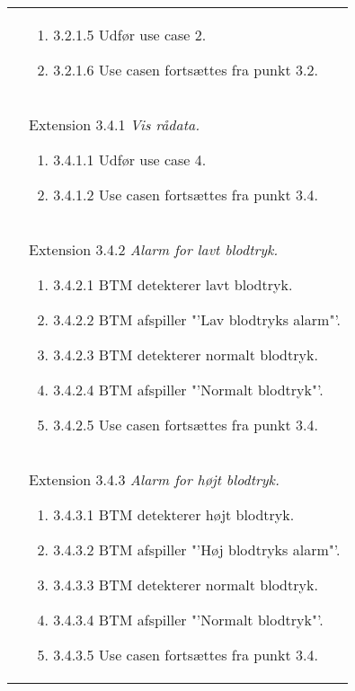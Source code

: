 \begin{table}[H]
\begin{tabular}{|p{5.5cm}|p{10cm}|}
\hline
& \begin{enumerate}
\item[\labelname]3.2.1.5   Udfør use case 2.
\item[\labelname]3.2.1.6   Use casen fortsættes fra punkt 3.2. 
\end{enumerate}
\\
& Extension 3.4.1 \textit{Vis rådata.}
\begin{enumerate}
\setlength\itemsep{0.1em}
\item[\labelname]3.4.1.1   Udfør use case 4.
\item[\labelname]3.4.1.2   Use casen fortsættes fra punkt 3.4. 
\end{enumerate}
\\
& Extension 3.4.2 \textit{Alarm for lavt blodtryk.}
\begin{enumerate}
\setlength\itemsep{0.1em}
\item[\labelname]3.4.2.1   BTM detekterer lavt blodtryk.
\item[\labelname]3.4.2.2   BTM afspiller "'Lav blodtryks alarm"'.
\item[\labelname]3.4.2.3   BTM detekterer normalt blodtryk.
\item[\labelname]3.4.2.4   BTM afspiller "'Normalt blodtryk"'. 
\item[\labelname]3.4.2.5   Use casen fortsættes fra punkt 3.4. 
\end{enumerate}
\\
& Extension 3.4.3 \textit{Alarm for højt blodtryk.}
\begin{enumerate}
\setlength\itemsep{0.1em}
\item[\labelname]3.4.3.1   BTM detekterer højt blodtryk.
\item[\labelname]3.4.3.2   BTM afspiller "'Høj blodtryks alarm"'.
\item[\labelname]3.4.3.3   BTM detekterer normalt blodtryk.
\item[\labelname]3.4.3.4   BTM afspiller "'Normalt blodtryk"'. 
\item[\labelname]3.4.3.5   Use casen fortsættes fra punkt 3.4. 
\end{enumerate}

\\\hline
\end{tabular}
\end{table}

